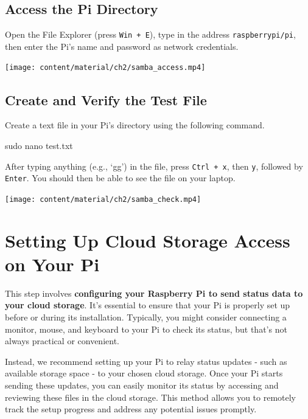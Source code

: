 \documentclass[
  letterpaper,
]{scrbook}
\newenvironment{Shaded}{\begin{snugshade}}{\end{snugshade}}
\newcommand{\FunctionTok}[1]{\textcolor[rgb]{0.28,0.35,0.67}{#1}}
\newcommand{\NormalTok}[1]{\textcolor[rgb]{0.00,0.23,0.31}{#1}}
\begin{document}
\hypertarget{access-the-pi-directory}{%
\subsection{Access the Pi Directory}\label{access-the-pi-directory}}

Open the File Explorer (press \texttt{Win\ +\ E}), type in the address
\texttt{raspberrypi/pi}, then enter the Pi's name and password as
network credentials.

\texttt{[image: content/material/ch2/samba\_access.mp4]}

\hypertarget{create-and-verify-the-test-file}{%
\subsection{Create and Verify the Test
File}\label{create-and-verify-the-test-file}}

Create a text file in your Pi's directory using the following command.

\begin{Shaded}
\begin{Highlighting}[]
\FunctionTok{sudo}\NormalTok{ nano test.txt}
\end{Highlighting}
\end{Shaded}

After typing anything (e.g., `gg') in the file, press
\texttt{Ctrl\ +\ x}, then \texttt{y}, followed by \texttt{Enter}. You
should then be able to see the file on your laptop.

\texttt{[image: content/material/ch2/samba\_check.mp4]}

\hypertarget{setting-up-cloud-storage-access-on-your-pi}{%
\section{Setting Up Cloud Storage Access on Your
Pi}\label{setting-up-cloud-storage-access-on-your-pi}}

This step involves \textbf{configuring your Raspberry Pi to send status
data to your cloud storage}. It's essential to ensure that your Pi is
properly set up before or during its installation. Typically, you might
consider connecting a monitor, mouse, and keyboard to your Pi to check
its status, but that's not always practical or convenient.

Instead, we recommend setting up your Pi to relay status updates - such
as available storage space - to your chosen cloud storage. Once your Pi
starts sending these updates, you can easily monitor its status by
accessing and reviewing these files in the cloud storage. This method
allows you to remotely track the setup progress and address any
potential issues promptly.
\end{document}
